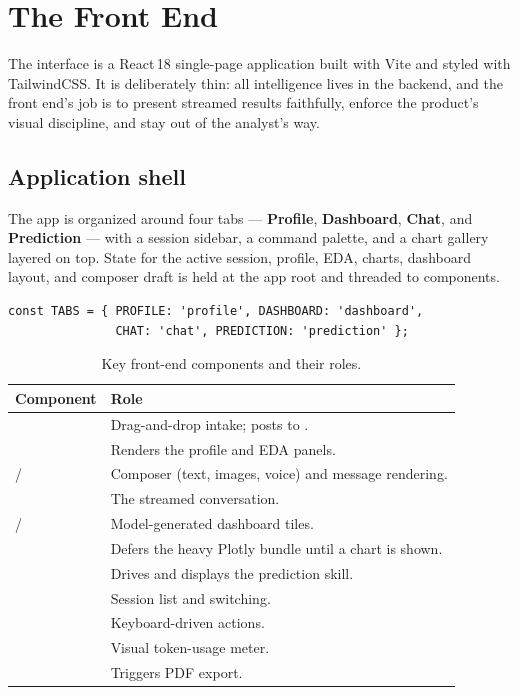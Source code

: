 \chapter{The Front End}
\label{ch:frontend}

The interface is a React\,18 single-page application built with Vite and styled
with TailwindCSS. It is deliberately thin: all intelligence lives in the
backend, and the front end's job is to present streamed results faithfully,
enforce the product's visual discipline, and stay out of the analyst's way.

\section{Application shell}
The app is organized around four tabs --- \textbf{Profile}, \textbf{Dashboard},
\textbf{Chat}, and \textbf{Prediction} --- with a session sidebar, a command
palette, and a chart gallery layered on top. State for the active session,
profile, EDA, charts, dashboard layout, and composer draft is held at the app
root and threaded to components.

\begin{lstlisting}[style=js,caption={The four primary views.}]
const TABS = { PROFILE: 'profile', DASHBOARD: 'dashboard',
               CHAT: 'chat', PREDICTION: 'prediction' };
\end{lstlisting}

\begin{table}[h]
\centering
\caption{Key front-end components and their roles.}
\small
\begin{tabularx}{\linewidth}{@{}L{3.5cm} X@{}}
\toprule
\textbf{Component} & \textbf{Role} \\
\midrule
{} & Drag-and-drop intake; posts to . \\
 & Renders the profile and EDA panels. \\
 /  & Composer (text, images, voice) and
message rendering. \\
 & The streamed conversation. \\
 /  & Model-generated dashboard tiles. \\
 & Defers the heavy Plotly bundle until a chart is shown. \\
 & Drives and displays the prediction skill. \\
 & Session list and switching. \\
 & Keyboard-driven actions. \\
 & Visual token-usage meter. \\
 & Triggers PDF export. \\
\bottomrule
\end{tabularx}
\end{table}


